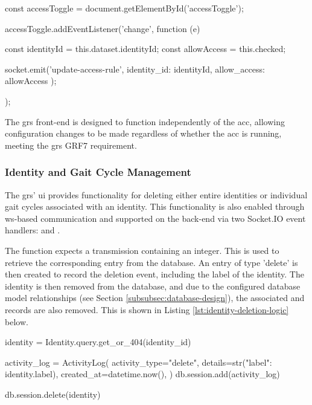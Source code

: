 \begin{code}[minted language=javascript]
const accessToggle = document.getElementById('accessToggle');

accessToggle.addEventListener('change', function (e) {
	const identityId = this.dataset.identityId;
	const allowAccess = this.checked;

	socket.emit('update-access-rule', {
		identity_id: identityId,
		allow_access: allowAccess
	});
});
\end{code}
\label{lst:access-rule-toggle-frontend} \vspace{10pt}

The \ac{grs} front-end is designed to function independently of the \ac{acc}, allowing configuration changes to be made regardless of whether the \ac{acc} is running, meeting the \ac{grs} GRF7 requirement.

\subsubsection{Identity and Gait Cycle Management}
\label{subsec:identity-and-gait-cycle-management}

The \ac{grs}' \ac{ui} provides functionality for deleting either entire identities or individual gait cycles associated with an identity.
This functionality is also enabled through \ac{ws}-based communication and supported on the back-end via two Socket.IO event handlers:  and .

The  function expects a transmission containing an  integer.
This is used to retrieve the corresponding  entry from the database.
An  entry of type 'delete' is then created to record the deletion event, including the label of the identity.
The identity is then removed from the database, and due to the configured database model relationships (see Section \ref{subsubsec:database-design}), the associated  and  records are also removed.
This is shown in Listing \ref{lst:identity-deletion-logic} below. 

\begin{code}
identity = Identity.query.get_or_404(identity_id)

activity_log = ActivityLog(
	activity_type="delete",
	details=str({"label": identity.label}),
	created_at=datetime.now(),
)
db.session.add(activity_log)

db.session.delete(identity)
\end{code}
\label{lst:identity-deletion-logic} \vspace{10pt}

